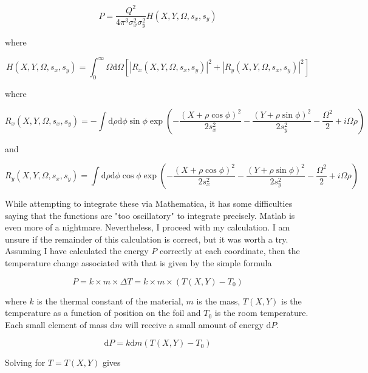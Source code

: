 \documentclass[12pt]{article}
\begin{document}
\begin{equation}
P=\frac{Q^2}{4 \pi^{3} \sigma_{x}^{2} \sigma_{y}^{2}} H(X,Y,\Omega,s_x,s_y)
\end{equation}

where

\begin{equation}
H(X,Y,\Omega,s_x,s_y)=\int_0^{\infty} \Omega \mathrm{d} \Omega [|R_{x} (X,Y,\Omega,s_x,s_y)|^2+|R_{y} (X,Y,\Omega,s_x,s_y)|^2]
\end{equation}

where

\begin{equation}
R_{x} (X,Y,\Omega,s_x,s_y)=- \int \mathrm{d} \rho \mathrm{d} \phi \sin \phi \exp{(-\frac{(X+\rho \cos \phi)^2}{2 s_{x}^{2}}-\frac{(Y+\rho \sin \phi)^2}{2 s_{y}^{2}}-\frac{\Omega^2}{2}+i \Omega \rho)}
\end{equation}

and

\begin{equation}
R_{y} (X,Y,\Omega,s_x,s_y)= \int \mathrm{d} \rho \mathrm{d} \phi \cos \phi \exp{(-\frac{(X+\rho \cos \phi)^2}{2 s_{x}^{2}}-\frac{(Y+\rho \sin \phi)^2}{2 s_{y}^{2}}-\frac{\Omega^2}{2}+i \Omega \rho)}
\end{equation}

While attempting to integrate these via Mathematica, it has some difficulties saying that the functions are "too oscillatory" to integrate precisely. Matlab is even more of a nightmare. Nevertheless, I proceed with my calculation. I am unsure if the remainder of this calculation is correct, but it was worth a try. Assuming I have calculated the energy $P$ correctly at each coordinate, then the temperature change associated with that is given by the simple formula

\begin{equation}
P=k \times m \times \Delta T=k \times m \times (T(X,Y)-T_0)
\end{equation}

where $k$ is the thermal constant of the material, $m$ is the mass, $T(X,Y)$ is the temperature as a function of position on the foil and $T_0$ is the room temperature. Each small element of mass d$m$ will receive a small amount of energy d$P$.

\begin{equation}
\mathrm{d}P=k \mathrm{d}m (T(X,Y)-T_0)
\end{equation}

Solving for $T=T(X,Y)$ gives
\end{document}
